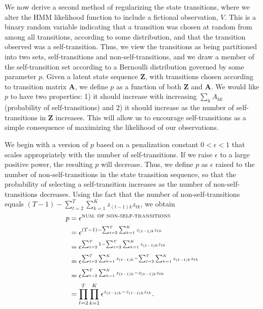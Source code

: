 We now derive a second method of regularizing the state transitions, where we alter the HMM likelihood function to include a fictional observation, $V$. This is a binary random variable indicating that a transition was chosen at random from among all transitions, according to some distribution, and that the transition observed was a self-transition. Thus, we view the transitions as being partitioned into two sets, self-transitions and non-self-transitions, and we draw a member of the self-transition set according to a Bernoulli distribution governed by some parameter $p$. Given a latent state sequence $\mathbf{Z}$, with transitions chosen according to transition matrix $\mathbf{A}$, we define $p$ as a function of both $\mathbf{Z}$ and $\mathbf{A}$. We would like $p$ to have two properties: 1) it should increase with increasing $\sum_k A_{kk}$ (probability of self-transitions) and 2) it should increase as the number of self-transitions in $\mathbf{Z}$ increases. This will allow us to encourage self-transitions as a simple consequence of maximizing the likelihood of our observations.

We begin with a version of $p$ based on a penalization constant $0 < \epsilon < 1$ that scales appropriately with the number of self-transitions. If we raise $\epsilon$ to a large positive power, the resulting $p$ will decrease. Thus, we define $p$ as $\epsilon$ raised to the number of non-self-transitions in the state transition sequence, so that the probability of selecting a self-transition increases as the number of non-self-transitions decreases. Using the fact that the number of non-self-transitions equals $(T-1) - \sum^{T}_{t=2}\sum^{K}_{k=1}z_{(t-1)k}z_{tk}$, we obtain 
\begin{align}
    p &= \epsilon^\text{\tiny NUM.\ OF NON-SELF-TRANSITIONS}\\
      &= \epsilon^{(T-1) - \sum^{T}_{t=2}\sum^{K}_{k=1}z_{(t-1)k}z_{tk}} \notag\\
      &= \epsilon^{\sum^{T}_{t=2}1 - \sum^{T}_{t=2}\sum^{K}_{k=1}z_{(t-1)k}z_{tk}} \notag\\
      &= \epsilon^{\sum^{T}_{t=2}\sum^{K}_{k=1}z_{(t-1)k} - \sum^{T}_{t=2}\sum^{K}_{k=1}z_{(t-1)k}z_{tk}} \notag\\
      &= \epsilon^{\sum^{T}_{t=2}\sum^{K}_{k=1}z_{(t-1)k} - z_{(t-1)k}z_{tk}} \notag\\
      &= \prod^{T}_{t=2}\prod_{k=1}^{K}\epsilon^{z_{(t-1)k} - z_{(t-1)k}z_{tk}}. \label{eq:eps-0}
\end{align}

